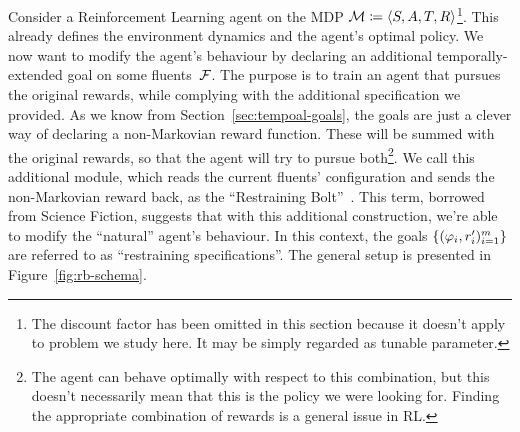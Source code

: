 Consider a Reinforcement Learning agent on the MDP $\mathcal{M} \coloneqq \langle
S, A, T, R \rangle$\footnote{The discount factor has been omitted in this
section because it doesn't apply to problem we study here. It may be simply
regarded as tunable parameter.}. This already defines the environment dynamics
and the agent's optimal policy. We now want to modify the agent's behaviour by
declaring an additional temporally-extended goal on some fluents~$\mathcal{F}$.
The purpose is to train an agent that pursues the original rewards, while
complying with the additional specification we provided.  As we know from
Section~\ref{sec:tempoal-goals}, the \ldl{} goals are just a clever way of
declaring a non-Markovian reward function. These will be summed with the
original rewards, so that the agent will try to pursue both\footnote{
	The agent can behave optimally with respect to this combination, but this
	doesn't necessarily mean that this is the policy we were looking for.
	Finding the appropriate combination of rewards is a general issue in RL.
}.
We call this additional module, which reads the current fluents' configuration
and sends the non-Markovian reward back, as the ``Restraining
Bolt''~\cite{bib:bolt}. This term, borrowed from Science Fiction, suggests
that with this additional construction, we're able to modify the ``natural''
agent's behaviour. In this context, the \ldl{} goals $\{(\varphi_i,
r_i')_{i=1}^m\}$ are referred to as ``restraining specifications''. The general
setup is presented in Figure~\ref{fig:rb-schema}.
